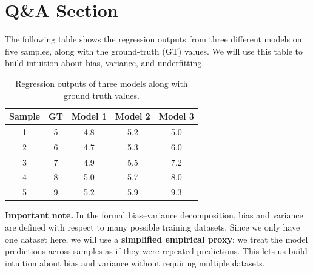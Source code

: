 \documentclass{article}
\begin{document}



\section{Q\&A Section}
The following table shows the regression outputs from three different models on five samples, along with the ground-truth (GT) values. We will use this table to build intuition about bias, variance, and underfitting.

\begin{table}[H]
    \centering
    \begin{tabular}{|c|c|c|c|c|}
        \hline
        Sample & GT & Model 1 & Model 2 & Model 3 \\ \hline
        1      & 5  & 4.8    & 5.2    & 5.0    \\ \hline
        2      & 6  & 4.7    & 5.3    & 6.0    \\ \hline
        3      & 7  & 4.9    & 5.5    & 7.2    \\ \hline
        4      & 8  & 5.0    & 5.7    & 8.0    \\ \hline
        5      & 9  & 5.2    & 5.9    & 9.3    \\ \hline
    \end{tabular}
    \caption{Regression outputs of three models along with ground truth values.}
\end{table}

\vspace{0.3cm}

\noindent\textbf{Important note.}
In the formal bias--variance decomposition, bias and variance are defined with 
respect to many possible training datasets. Since we only have one dataset here, 
we will use a \textbf{simplified empirical proxy}: we treat the model predictions 
across samples as if they were repeated predictions. This lets us build intuition 
about bias and variance without requiring multiple datasets.
\end{document}

